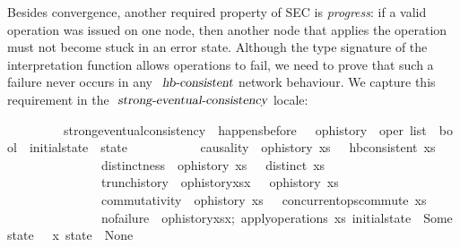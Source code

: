 Besides convergence, another required property of SEC is \emph{progress}: if a valid operation was issued on one node, then another node that applies the operation must not become stuck in an error state.
Although the type signature of the interpretation function allows operations to fail, we need to prove that such a failure never occurs in any $\isa{hb-consistent}$ network behaviour.
We capture this requirement in the $\isa{strong-eventual-consistency}$ locale:
\vspace{0.25em}
\begin{isabellebody}
\ \ \ \ \ \ \ \ \ strong{\isacharunderscore}eventual{\isacharunderscore}consistency\ {\isacharequal}\ happens{\isacharunderscore}before\ {\isacharplus}\ \ op{\isacharunderscore}history\ {\isacharcolon}{\isacharcolon}\ {\isachardoublequoteopen}{\isacharprime}oper\ list\ {\isasymRightarrow}\ bool{\isachardoublequoteclose}\ \ initial{\isacharunderscore}state\ {\isacharcolon}{\isacharcolon}\ {\isachardoublequoteopen}{\isacharprime}state{\isachardoublequoteclose}\isanewline
\ \ \ \ \ \ \ \ \ \ \ causality{\isacharcolon}\ {\isasymlbrakk}\ {\isachardoublequoteopen}op{\isacharunderscore}history\ xs\ {\isasymrbrakk}\ {\isasymLongrightarrow}\ hb{\isacharunderscore}consistent\ xs{\isachardoublequoteclose}\isanewline
\ \ \ \ \ \ \ \ \ \ \ \ \ \ \ distinctness{\isacharcolon}\ {\isasymlbrakk}\ {\isachardoublequoteopen}op{\isacharunderscore}history\ xs\ {\isasymrbrakk}\ {\isasymLongrightarrow}\ distinct\ xs{\isachardoublequoteclose}\isanewline
\ \ \ \ \ \ \ \ \ \ \ \ \ \ \ trunc{\isacharunderscore}history{\isacharcolon}\ {\isasymlbrakk}\ {\isachardoublequoteopen}op{\isacharunderscore}history{\isacharparenleft}xs{\isacharat}{\isacharbrackleft}x{\isacharbrackright}{\isacharparenright}\ {\isasymrbrakk}\ {\isasymLongrightarrow}\ op{\isacharunderscore}history\ xs{\isachardoublequoteclose}\isanewline
\ \ \ \ \ \ \ \ \ \ \ \ \ \ \ commutativity{\isacharcolon}\ {\isasymlbrakk}\ {\isachardoublequoteopen}op{\isacharunderscore}history\ xs\ {\isasymrbrakk}\ {\isasymLongrightarrow}\ concurrent{\isacharunderscore}ops{\isacharunderscore}commute\ xs{\isachardoublequoteclose}\isanewline
  \ \ \ \ \ \ \ \ \ \ \ \ \ \ \ no{\isacharunderscore}failure{\isacharcolon}\ {\isasymlbrakk}\ {\isachardoublequoteopen}op{\isacharunderscore}history{\isacharparenleft}xs{\isacharat}{\isacharbrackleft}x{\isacharbrackright}{\isacharparenright};\ apply{\isacharunderscore}operations\ xs\ initial{\isacharunderscore}state\ {\isacharequal}\ Some\ state\ {\isasymrbrakk}\ {\isasymLongrightarrow}\ {\isasymlangle}x{\isasymrangle}\ state\ {\isasymnoteq}\ None{\isachardoublequoteclose}
\end{isabellebody}
